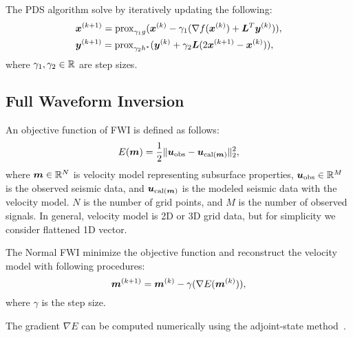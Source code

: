 The PDS algorithm solve by iteratively updating the following:
\begin{equation} \label{eq:PDSSubStep} \begin{aligned} & \bm{x}^{(k+1)} = \mathrm{prox}_{\gamma_1 g}(\bm{x}^{(k)} - \gamma_1( \nabla f(\bm{x}^{(k)}) + \bm{L}^T \bm{y}^{(k)} )), \\ & \bm{y}^{(k+1)} = \mathrm{prox}_{\gamma_2 h^*}(\bm{y}^{(k)} + \gamma_2 \bm{L} (2\bm{x}^{(k+1)} - \bm{x}^{(k)}) ), \\ \end{aligned} \end{equation}
where $\gamma_1, \gamma_2 \in \mathbb{R}$ are step sizes.

\subsection{Full Waveform Inversion}\label{subsec:full-waveform-inversion}
An objective function of FWI is defined as follows\cite{FWI0}:
\begin{equation} \label{eq:FWIObjective} E(\bm{m}) = \frac {1} {2} \lVert  \bm{u}_{\mathrm{obs}} - \bm{u}_{\mathrm{cal}(\bm{m})}  \rVert _2^2, \end{equation}
where $\bm{m} \in \mathbb{R}^{N}$ is velocity model representing subsurface properties, $\bm{u}_{\mathrm{obs}} \in \mathbb{R}^{M}$ is the observed seismic data, and $\bm{u}_{\mathrm{cal}(\bm{m})}$ is the modeled seismic data with the velocity model.
$N$ is the number of grid points, and $M$ is the number of observed signals.
In general, velocity model is 2D or 3D grid data, but for simplicity we consider flattened 1D vector.

The Normal FWI minimize the objective function and reconstruct the velocity model with following procedures:
\begin{equation} \label{eq:FWIWithGradient} \bm{m}^{(k+1)} = \bm{m}^{(k)} - \gamma( \nabla E(\bm{m}^{(k)}) ), \end{equation}
where $\gamma$ is the step size.

The gradient ${\nabla E}$ can be computed numerically using the adjoint-state method~\cite{FWI-gradient}.
